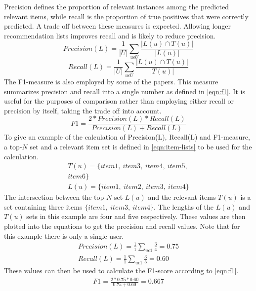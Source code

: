 Precision defines the proportion of relevant instances among the predicted relevant items, while recall is the proportion of true positives that were correctly predicted.
A trade off between these measures is expected.
Allowing longer recommendation lists improves recall and is likely to reduce precision\cite{RecommenderHandbook2015}.
\begin{equation}
    \label{eqn:precision}
    Precision(L) = \frac{1}{|U|} \sum\limits_{u \epsilon U}\frac{|L(u) \cap T(u)|}{|L(u)|}
\end{equation}
\begin{equation}
    \label{eqn:recall}
    Recall(L) = \frac{1}{|U|} \sum\limits_{u \epsilon U} \frac{|L(u) \cap T(u)|}{|T(u)|}
\end{equation}
The F1-measure is also employed by some of the papers.
This measure summarizes precision and recall into a single number as defined in \autoref{eqn:f1}.
It is useful for the purposes of comparison rather than employing either recall or precision by itself, taking the trade off into account.
\begin{equation}
    \label{eqn:f1}
    F1 = \frac{2*Precision(L)*Recall(L)}{Precision(L)+Recall(L)}
\end{equation}
To give an example of the calculation of Precision(L), Recall(L) and F1-measure, a top-$N$ set and a relevant item set is defined in \autoref{eqn:item-lists} to be used for the calculation.
\begin{align}
    T(u) = \{item1, \: item3, \: item4, \: item5,\nonumber \\
     item6\} \nonumber \\
    L(u) = \{item1, \: item2, \: item3, \: item4\}\label{eqn:item-lists}
\end{align}
The intersection between the top-$N$ set $L(u)$ and the relevant items $T(u)$ is a set containing three items $\{item1, \: item3, \: item4\}$.
The lengths of the $L(u)$ and $T(u)$ sets in this example are four and five respectively.
These values are then plotted into the equations to get the precision and recall values.
Note that for this example there is only a single user.
\begin{align*}
    Precision(L) = \frac{1}{1} \sum\limits_{u \epsilon 1}\frac{3}{4} = 0.75\\
    Recall(L) = \frac{1}{1} \sum\limits_{u \epsilon 1} \frac{3}{5} = 0.60
\end{align*}
These values can then be used to calculate the F1-score according to \autoref{eqn:f1}.
\begin{align*}
    F1 = \frac{2*0.75*0.60}{0.75+0.60} = 0.667
\end{align*}
